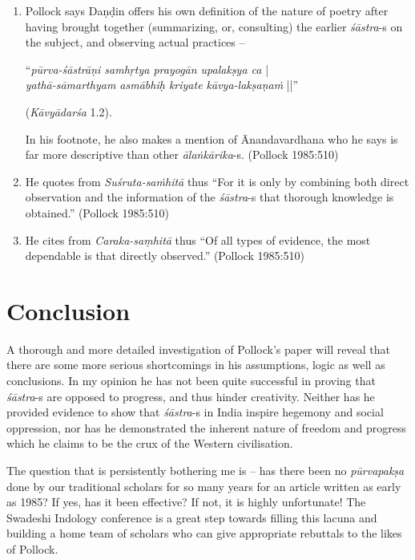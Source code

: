 \begin{enumerate}
\item Pollock says Daṇḍin offers his own definition of the nature of poetry after having brought together (summarizing, or, consulting) the earlier {\it śāstra}-s on the subject, and observing actual practices -- 

``\textsl{pūrva-śāstrāṇi samhṛtya prayogān upalakṣya ca} |\\
\textsl{yathā-sāmarthyam asmābhiḥ kriyate kāvya-lakṣaṇaṁ} ||'' 

\hfill (\textsl{Kāvyādarśa} 1.2).

In his footnote, he also makes a mention of Ānandavardhana who he says is far more descriptive than other {\it ālaṅkārika}-s. (Pollock 1985:510)

\item He quotes from \textsl{Suśruta-saṁhitā} thus ``For it is only by combining both direct observation and the information of the {\it śāstra}-s that thorough knowledge is obtained.'' (Pollock 1985:510)

\item He cites from \textsl{Caraka-saṃhitā} thus ``Of all types of evidence, the most dependable is that directly observed.'' (Pollock 1985:510)
\end{enumerate}

\newpage

\section*{Conclusion}

A thorough and more detailed investigation of Pollock's paper will reveal that there are some more serious shortcomings in his assumptions, logic as well as conclusions. In my opinion he has not been quite successful in proving that {\it śāstra}-s are opposed to progress, and thus hinder creativity. Neither has he provided evidence to show that {\it śāstra}-s in India inspire hegemony and social oppression, nor has he demonstrated the inherent nature of freedom and progress which he claims to be the crux of the Western civilisation.

The question that is persistently bothering me is -- has there been no {\it pūrvapakṣa} done by our traditional scholars for so many years for an article written as early as 1985? If yes, has it been effective? If not, it is highly unfortunate! The Swadeshi Indology conference is a great step towards filling this lacuna and building a home team of scholars who can give appropriate rebuttals to the likes of Pollock.

